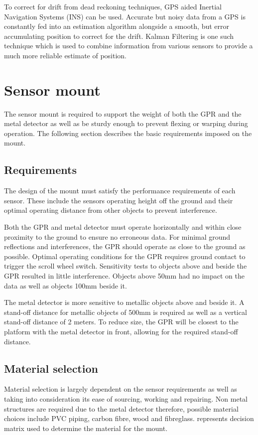 \documentclass[main.tex]{subfiles}
\begin{document}
To correct for drift from dead reckoning techniques, GPS aided Inertial Navigation Systems (INS) can be used. Accurate but noisy data from a GPS is constantly fed into an estimation algorithm alongside a smooth, but error accumulating position to correct for the drift. Kalman Filtering is one such technique which is used to combine information from various sensors to provide a much more reliable estimate of position.

\section{Sensor mount}
The sensor mount is required to support the weight of both the GPR and the metal detector as well as be sturdy enough to prevent flexing or warping during operation. The following section describes the basic requirements imposed on the mount.  
\subsection {Requirements} 
The design of the mount must satisfy the performance requirements of each sensor. These include the sensors operating height off the ground and their optimal operating distance from other objects to prevent interference. 

Both the GPR and metal detector must operate horizontally and within close proximity to the ground to ensure no erroneous data.
For minimal ground reflections and interferences, the GPR should operate as close to the ground as possible. Optimal operating conditions for the GPR requires ground contact to trigger the scroll wheel switch. Sensitivity tests to objects above and beside the GPR resulted in little interference. Objects above 50mm had no impact on the data as well as objects 100mm beside it. 

The metal detector is more sensitive to metallic objects above and beside it. A stand-off distance for metallic objects of 500mm is required as well as a vertical stand-off distance of 2 meters. To reduce size, the GPR will be closest to the platform with the metal detector in front, allowing for the required stand-off distance.  
\subsection {Material selection}  
Material selection is largely dependent on the sensor requirements as well as taking into consideration its ease of sourcing, working and repairing. Non metal structures are required due to the metal detector therefore, possible material choices include PVC piping, carbon fibre, wood and fibreglass.  represents decision matrix used to determine the material for the mount.
\end{document}
